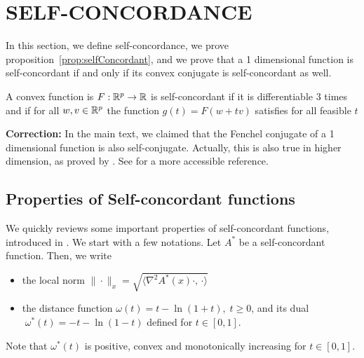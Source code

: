 \documentclass[twoside]{article}
\newcommand{\fdk}[1]{\textcolor{Periwinkle}{(fdk:#1)}}
\begin{document}
\section{SELF-CONCORDANCE}
\label{app:self-concordant}

In this section, we define self-concordance, we prove proposition~\ref{prop:selfConcordant}, and we prove that a 1 dimensional function is self-concordant if and only if its convex conjugate is self-concordant as well.

\begin{definition}
\label{def:self-concordance}
A convex function is $F:\mathbb{R}^p \rightarrow \mathbb{R}$ is self-concordant if it is differentiable $3$ times and if for all $w, v \in\mathbb{R}^p$ the function $g(t) = F(w+tv)$ satisfies for all feasible $t$
\end{definition}


{\bf Correction:} In the main text, we claimed that the Fenchel conjugate of a 1 dimensional function is also self-conjugate. 
Actually, this is also true in higher dimension, as proved by \citet{nesterov1994interior}. See \citet[Prop.~6]{sun2019generalized} for a more accessible reference.


\subsection{Properties of Self-concordant functions}

We quickly reviews some important properties of self-concordant functions, introduced in \citep{nesterov2003introductory}. We start with a few notations. Let $A^*$ be a self-concordant function. Then, we write
\begin{itemize}
	\item the local norm $\|\cdot\|_x = \sqrt{ \langle \nabla^2A^*(x)\cdot,\, \cdot \rangle }$ 
	\item the distance function $\omega(t) = t-\ln (1+t),\;t\geq 0$, and its dual $\;\omega^*(t) = -t-\ln(1-t)$ defined for $t\in [0,1]$.
\end{itemize}
Note that $\omega^*(t)$ is positive, convex and monotonically increasing for $t\in[0,1]$.
\end{document}
